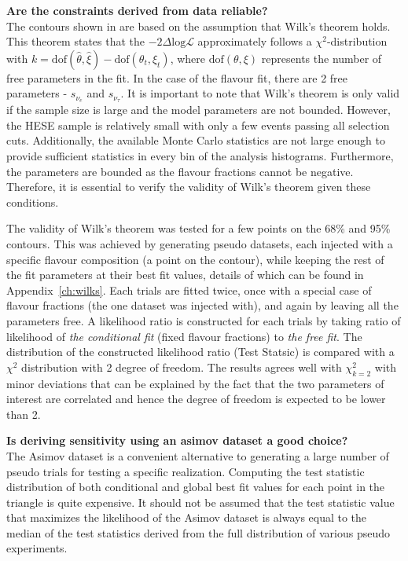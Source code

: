 \textbf{Are the constraints derived from data reliable?}\\
The contours shown in  are based on the assumption that Wilk's theorem holds. This theorem states that the $-2\Delta\mathrm{log}\mathcal{L}$ approximately follows a $\chi^2$-distribution with $k = \text{dof}(\hat{\theta}, \hat{\xi}) - \text{dof}(\theta_t, \xi_t)$, where $\text{dof}(\theta, \xi)$ represents the number of free parameters in the fit. In the case of the flavour fit, there are 2 free parameters - $s_{\nu_{e}}$ and $s_{\nu_{\tau}}$. It is important to note that Wilk's theorem is only valid if the sample size is large and the model parameters are not bounded. However, the HESE sample is relatively small with only a few events passing all selection cuts. Additionally, the available Monte Carlo statistics are not large enough to provide sufficient statistics in every bin of the analysis histograms. Furthermore, the parameters are bounded as the flavour fractions cannot be negative. Therefore, it is essential to verify the validity of Wilk's theorem given these conditions. 

The validity of Wilk's theorem was tested for a few points on the 68\% and 95\% contours. This was achieved by generating pseudo datasets, each injected with a specific flavour composition (a point on the contour), while keeping the rest of the fit parameters at their best fit values, details of which can be found in Appendix~\ref{ch:wilks}. Each trials are fitted twice, once with a special case of flavour fractions (the one dataset was injected with), and again by leaving all the parameters free. A likelihood ratio is constructed for each trials by taking ratio of likelihood of \emph{the conditional fit} (fixed flavour fractions) to \emph{the free fit}. The distribution of the constructed likelihood ratio (Test Statsic) is compared with a $\chi^2$ distribution with 2 degree of freedom. The results agrees well with $\chi_{k=2}^2$ with minor deviations that can be explained by the fact that the two parameters of interest are correlated and hence the degree of freedom is expected to be lower than 2.  
     
\textbf{Is deriving sensitivity using an asimov dataset a good choice?}\\
The Asimov dataset is a convenient alternative to generating a large number of pseudo trials for testing a specific realization. Computing the test statistic distribution of both conditional and global best fit values for each point in the triangle is quite expensive. It should not be assumed that the test statistic value that maximizes the likelihood of the Asimov dataset is always equal to the median of the test statistics derived from the full distribution of various pseudo experiments. 

